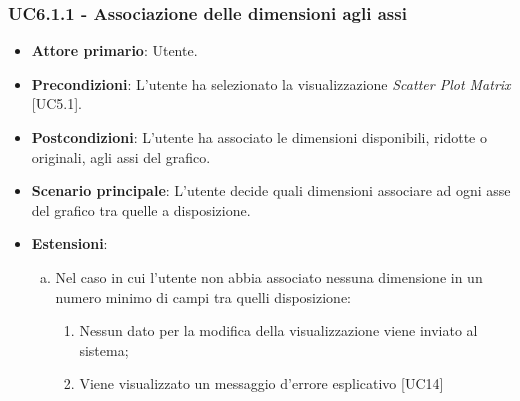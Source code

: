 \subsubsection{UC6.1.1 - Associazione delle dimensioni agli assi}
\begin{itemize}
	\item \textbf{Attore primario}: Utente.
	\item \textbf{Precondizioni}: L'utente ha selezionato la visualizzazione \textit{Scatter Plot Matrix} [UC5.1].
	\item \textbf{Postcondizioni}: L'utente ha associato le dimensioni disponibili, ridotte o originali, agli assi del grafico. 
	
	\item \textbf{Scenario principale}: L'utente decide quali dimensioni associare ad ogni asse del grafico tra quelle a disposizione.
	
		\item \textbf{Estensioni}:
	\begin{enumerate}[(a)]
		\item Nel caso in cui l'utente non abbia associato nessuna dimensione in un numero minimo di campi tra quelli disposizione:
		\begin{enumerate}[1.]
			\item Nessun dato per la modifica della visualizzazione viene inviato al sistema;
			\item Viene visualizzato un messaggio d'errore esplicativo [UC14]
		\end{enumerate}
	\end{enumerate}
\end{itemize}